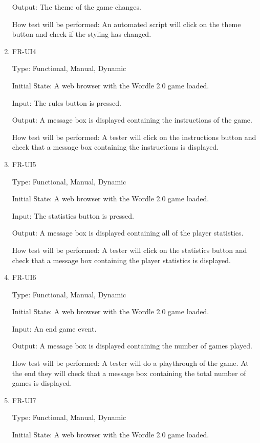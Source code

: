 \documentclass[12pt, titlepage]{article}
\begin{document}
\begin{enumerate}
Output: The theme of the game changes.

How test will be performed: An automated script will click on the theme button 
and 
check if the styling has changed. 

\item{FR-UI4\\}

Type: Functional, Manual, Dynamic

Initial State: A web browser with the Wordle 2.0 game loaded.

Input: The rules button is pressed.

Output: A message box is displayed containing the instructions of the game.

How test will be performed: A tester will click on the instructions button and 
check that a message box containing the instructions is displayed.

\item{FR-UI5\\}

Type: Functional, Manual, Dynamic

Initial State: A web browser with the Wordle 2.0 game loaded.

Input: The statistics button is pressed.

Output: A message box is displayed containing all of the player statistics.

How test will be performed: A tester will click on the statistics button and 
check that a message box containing the player statistics is displayed.

\item{FR-UI6\\}

Type: Functional, Manual, Dynamic

Initial State: A web browser with the Wordle 2.0 game loaded.

Input: An end game event.

Output: A message box is displayed containing the number of games played.

How test will be performed: A tester will do a playthrough of the game. At the 
end they will check that a message box containing the total number of games is 
displayed.

\item{FR-UI7\\}

Type: Functional, Manual, Dynamic

Initial State: A web browser with the Wordle 2.0 game loaded.


\end{enumerate}
\end{document}
